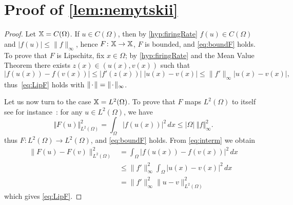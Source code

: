 \documentclass[a4paper,baskervaldx]{daarticle}
\begin{document}
\section{Proof of \texorpdfstring{\cref{lem:nemytskii}}{Lemma Nemytskii operator}}\label{app:proof:lem:nemytskii}
\begin{proof}
  Let $\mathbb{X} = C(\Omega)$. If $u \in C(\Omega)$, then by \cref{hyp:firingRate} 
  $f(u) \in C(\Omega)$ and $|f(u)| \leq \|f\|_\infty$, hence $F \colon \mathbb{X} \to
  \mathbb{X}$, $F$ is bounded, and \cref{eq:boundF} holds. To prove that $F$ is Lipschitz,
  fix $x \in \Omega$; by \cref{hyp:firingRate} and the Mean Value Theorem there exists $z(x) \in
  (u(x),v(x))$ such that 
  \begin{equation}\label{eq:interm}
    | f(u(x)) - f(v(x)) | \leq |f'(z(x))| \; | u(x) - v(x) | \leq \| f' \|_\infty |
    u(x) - v(x) |,
  \end{equation}
  thus~\cref{eq:LipF} holds with $\| {\mkern 2mu\cdot\mkern 2mu} \| = \| {\mkern 2mu\cdot\mkern 2mu} \|_\infty$.

  Let us now turn to the case $\mathbb{X} = L^2(\Omega)$. To prove that $F$ maps
  $L^2(\Omega)$ to itself see for instance~\cite[Lemma 3.30]{Lord:2014ir}: for any $u \in
  L^2(\Omega)$, we have
  \[
    \Vert F(u) \Vert^2_{L^2(\Omega)} = \int_\Omega |f(u(x))|^2\, dx \leq |\Omega| \;
    \Vert f \Vert^2_\infty.
  \]
  thus $F \colon L^2(\Omega) \to L^2(\Omega)$, and \cref{eq:boundF} holds. 
  From \cref{eq:interm} we obtain
  \[
    \begin{aligned}
      \| F(u) - F(v) \|^2_{L^2(\Omega)} & = \int_\Omega | f(u(x)) - f(v(x)) |^2 \, dx  \\
                          & \leq \| f' \|^2_\infty \int_\Omega | u(x) - v(x) |^2 \, dx \\
			  & = \| f' \|^2_\infty \| u - v \|^2_{L^2(\Omega)}
    \end{aligned}
  \]
  which gives \cref{eq:LipF}.
\end{proof}
\end{document}
